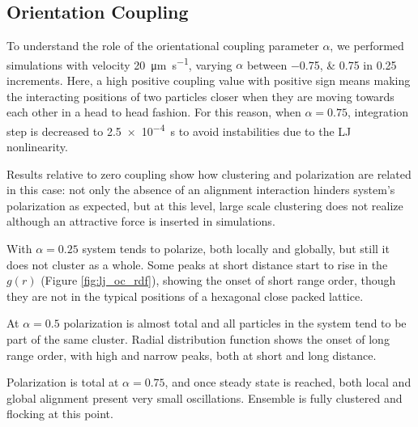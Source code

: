 \documentclass[../../master_thesis_np.tex]{subfiles}
\begin{document}
		\subsection{Orientation Coupling}%
		To understand the role of the orientational coupling parameter $\alpha$, we performed simulations with velocity \SI{20}{\um\per\second}, varying $\alpha$ between \numlist{-0.75; 0.75} in \num{0.25} increments. 
		Here, a  high positive coupling value with positive sign means making the interacting positions of two particles closer when they are moving towards each other in a head to head fashion.
		For this reason, when $\alpha = 0.75$, integration step is decreased to \SI{2.5e-4}{\second} to avoid instabilities due to the LJ nonlinearity.
		
		Results relative to zero coupling show how clustering and polarization are related in this case: not only the absence of an alignment interaction hinders system's polarization as expected, but at this level, large scale clustering does not realize although an attractive force is inserted in simulations.
		
		With $\alpha = 0.25$ system tends to polarize, both locally and globally, but still it does not cluster as a whole. 
		Some peaks at short distance start to rise in the $g(r)$ (Figure \ref{fig:lj_oc_rdf}), showing the onset of short range order, though they are not in the typical positions of a hexagonal close packed lattice.
		
		At $\alpha = 0.5$ polarization is almost total and all particles in the system tend to be part of the same cluster.
		Radial distribution function shows the onset of long range order, with high and narrow peaks, both at short and long distance.
		
		Polarization is total at $\alpha = 0.75$, and once steady state is reached, both local and global alignment present very small oscillations.
		Ensemble is fully clustered and flocking at this point.
		
\end{document}
